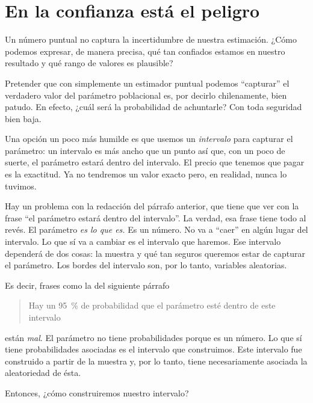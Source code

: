 \chapter{En la confianza está el peligro}

\begin{ideanote}
Un número puntual no captura la incertidumbre de nuestra estimación. ¿Cómo podemos expresar, de manera precisa, qué tan confiados estamos en nuestro resultado y qué rango de valores es plausible?
\end{ideanote}

Pretender que con simplemente un estimador puntual podemos \enquote{capturar}  el verdadero valor del parámetro poblacional es, por decirlo chilenamente, bien patudo. En efecto, ¿cuál será la probabilidad de achuntarle? Con toda seguridad bien baja. 

Una opción un poco más humilde es que usemos un \emph{intervalo} para capturar el parámetro: un intervalo es más ancho que un punto así que, con un poco de suerte, el parámetro estará dentro del intervalo. El precio que tenemos que pagar es la exactitud. Ya no tendremos un valor exacto pero, en realidad, nunca lo tuvimos. 

Hay un problema con la redacción del párrafo anterior, que tiene que ver con la frase \enquote{el parámetro estará dentro del intervalo}. La verdad, esa frase tiene todo al revés. El parámetro \emph{es lo que es.} Es un número. No va a \enquote{caer} en algún lugar del intervalo. Lo que sí va a cambiar es el intervalo que haremos. Ese intervalo dependerá de dos cosas: la muestra y qué tan seguros queremos estar de capturar el parámetro. Los bordes del intervalo son, por lo tanto, variables aleatorias. 

Es decir, frases como la del siguiente párrafo
\begin{quote}
Hay un \qty{95}{\percent} de probabilidad que el parámetro esté dentro de este intervalo
\end{quote}
están \emph{mal}. El parámetro no tiene probabilidades porque es un número. Lo que sí tiene probabilidades asociadas es el intervalo que construimos. Este intervalo fue construido a partir de la muestra y, por lo tanto, tiene necesariamente asociada la aleatoriedad de ésta.

Entonces, ¿cómo construiremos nuestro intervalo?

